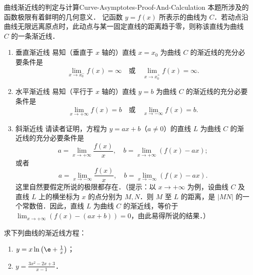\begin{problem}{曲线渐近线的判定与计算}{Curve-Asymptotes-Proof-And-Calculation}
    本题所涉及的函数极限有着鲜明的几何意义．
    记函数 $y = f(x)$ 所表示的曲线为 $C$．若动点沿曲线无限远离原点时，此动点与某一固定直线的距离趋于零，则称该直线为曲线 $C$ 的一条渐近线．
    \begin{enumerate}
        \item 垂直渐近线 易知（垂直于 $x$ 轴的）直线 $x = x_0$ 为曲线 $C$ 的渐近线的充分必要条件是
              \begin{equation}
                  \lim_{x\to x_0^-} f(x) = \infty \quad \text{或} \quad \lim_{x\to x_0^+} f(x) = \infty.
              \end{equation}
        \item 水平渐近线 易知（平行于 $x$ 轴的）直线 $y = b$ 为曲线 $C$ 的渐近线的充分必要条件是
              \begin{equation}
                  \lim_{x\to +\infty} f(x) = b \quad \text{或} \quad \lim_{x\to -\infty} f(x) = b.
              \end{equation}
        \item 斜渐近线 请读者证明，方程为 $y = ax + b$（$a \neq 0$）的直线 $L$ 为曲线 $C$ 的渐近线的充分必要条件是
              \begin{equation}
                  a = \lim_{x\to +\infty} \frac{f(x)}{x}, \quad b = \lim_{x\to +\infty} (f(x) - ax);
              \end{equation}
              或者
              \begin{equation}
                  a = \lim_{x\to -\infty} \frac{f(x)}{x}, \quad b = \lim_{x\to -\infty} (f(x) - ax).
              \end{equation}
              这里自然要假定所说的极限都存在．（提示：以 $x \to +\infty$ 为例，设曲线 $C$ 及直线 $L$ 上的横坐标为 $x$ 的点分别为 $M, N$．则 $M$ 至 $L$ 的距离，是 $|MN|$ 的一个常数倍．因此，直线 $L$ 为曲线 $C$ 的渐近线，等价于 $\lim_{x\to +\infty} (f(x) - (ax + b)) = 0$，由此易得所说的结果．）
    \end{enumerate}
    求下列曲线的渐近线方程：
    \begin{enumerate}
        \item $y = x\ln\left( \e + \frac{1}{x} \right)$；
        \item $y = \frac{3x^2 - 2x + 3}{x - 1}$．
    \end{enumerate}
\end{problem}

